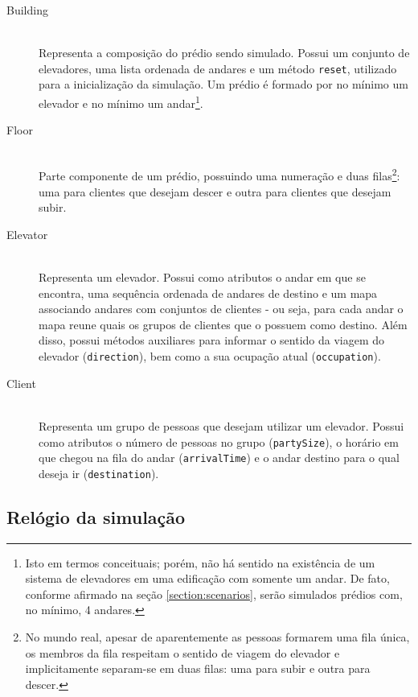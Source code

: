\begin{description}
  \item[Building] \hfill \\
    Representa a composição do prédio sendo simulado. Possui um conjunto de
    elevadores, uma lista ordenada de andares e um método \texttt{reset},
    utilizado para a inicialização da simulação. Um prédio é formado por no
    mínimo um elevador e no mínimo um andar\footnote{Isto em termos conceituais;
    porém, não há sentido na existência de um sistema de elevadores em uma
    edificação com somente um andar. De fato, conforme afirmado na seção
    \ref{section:scenarios}, serão simulados prédios com, no mínimo, 4
    andares.}.

  \item[Floor] \hfill \\
    Parte componente de um prédio, possuindo uma numeração e duas
    filas\footnote{No mundo real, apesar de aparentemente as pessoas formarem
    uma fila única, os membros da fila respeitam o sentido de viagem do elevador
    e implicitamente separam-se em duas filas: uma para subir e outra para
    descer.}: uma para clientes que desejam descer e outra para clientes que
    desejam subir.

\item[Elevator] \hfill \\
    Representa um elevador. Possui como atributos o andar em que se
    encontra, uma sequência ordenada de andares de destino e um mapa associando
    andares com conjuntos de clientes - ou seja, para cada andar o mapa reune
    quais os grupos de clientes que o possuem como destino. Além disso, possui
    métodos auxiliares para informar o sentido da viagem do elevador
    (\texttt{direction}), bem como a sua ocupação atual (\texttt{occupation}).

\item[Client] \hfill \\
    Representa um grupo de pessoas que desejam utilizar um elevador. Possui como
    atributos o número de pessoas no grupo (\texttt{partySize}), o horário em
    que chegou na fila do andar (\texttt{arrivalTime}) e o andar destino para o
    qual deseja ir (\texttt{destination}).

\end{description}

\subsection{Relógio da simulação}

